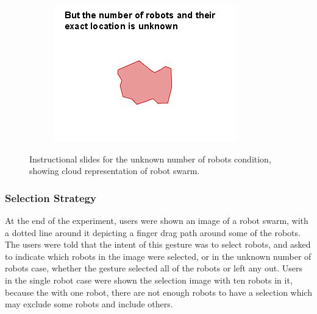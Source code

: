 \begin{figure}
\begin{subfigure}{0.3\textwidth}
		\includegraphics[width=\linewidth]{../ui_experiment/slide_images/Swarm_Robot_Control_-_Unknown_Number_of_Robots_0003.png}
	\end{subfigure}
	\caption{Instructional slides for the unknown number of robots condition, showing cloud representation of robot swarm.}
	\label{instructional_slides}
\end{figure}

\subsubsection{Selection Strategy}

At the end of the experiment, users were shown an image of a robot swarm, with a dotted line around it depicting a finger drag path around some of the robots. 
The users were told that the intent of this gesture was to select robots, and asked to indicate which robots in the image were selected, or in the unknown number of robots case, whether the gesture selected all of the robots or left any out. 
Users in the single robot case were shown the selection image with ten robots in it, because the with one robot, there are not enough robots to have a selection which may exclude some robots and include others. 

